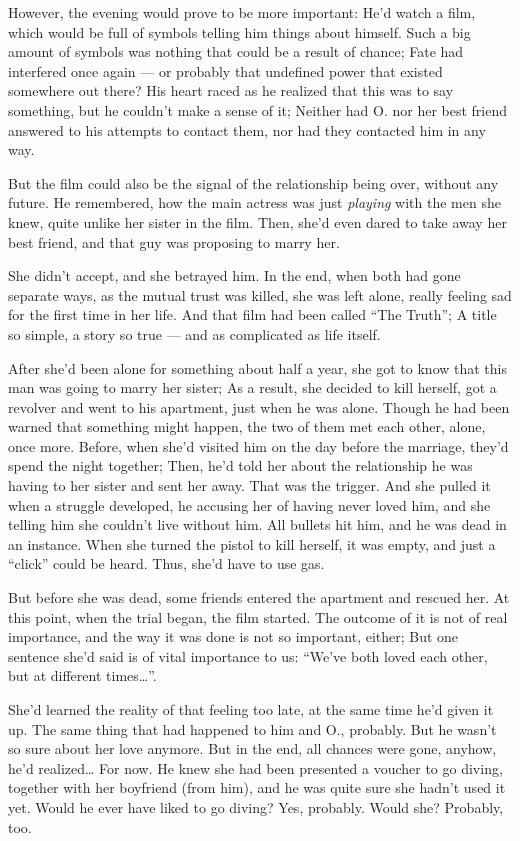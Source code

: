 However, the evening would prove to be more important: He'd watch a film, which would be full of symbols telling him things about himself. 
Such a big amount of symbols was nothing that could be a result of chance; Fate had interfered once again --- or probably that undefined power that existed somewhere out there?
His heart raced as he realized that this was to say something, but he couldn't make a sense of it; Neither had O. nor her best friend answered to his attempts to contact them, nor had they contacted him in any way.

But the film could also be the signal of the relationship being over, without any future. 
He remembered, how the main actress was just \emph{playing} with the men she knew, quite unlike her sister in the film. Then, she'd even dared to take away her best friend, and that guy was proposing to marry her.

She didn't accept, and she betrayed him. In the end, when both had gone separate ways, as the mutual trust was killed, she was left alone, really feeling sad for the first time in her life. And that film had been called \enquote{The Truth}; A title so simple, a story so true --- and as complicated as life itself.

After she'd been alone for something about half a year, she got to know that this man was going to marry her sister; As a result, she decided to kill herself, got a revolver and went to his apartment, just when he was alone. Though he had been warned that something might happen, the two of them met each other, alone, once more. Before, when she'd visited him on the day before the marriage, they'd spend the night together; Then, he'd told her about the relationship he was having to her sister and sent her away. 
That was the trigger. 
And she pulled it when a struggle developed, he accusing her of having never loved him, and she telling him she couldn't live without him. 
All bullets hit him, and he was dead in an instance. When she turned the pistol to kill herself, it was empty, and just a \enquote{click} could be heard.
Thus, she'd have to use gas.

But before she was dead, some friends entered the apartment and rescued her. 
At this point, when the trial began, the film started. 
The outcome of it is not of real importance, and the way it was done is not so important, either; But one sentence she'd said is of vital importance to us: \enquote{We've both loved each other, but at different times\ldots}.

She'd learned the reality of that feeling too late, at the same time he'd given it up. 
The same thing that had happened to him and O., probably. But he wasn't so sure about her love anymore. 
But in the end, all chances were gone, anyhow, he'd realized\ldots
For now. 
He knew she had been presented a voucher to go diving, together with her boyfriend (from him), and he was quite sure she hadn't used it yet. Would he ever have liked to go diving? Yes, probably. 
Would she? Probably, too.

